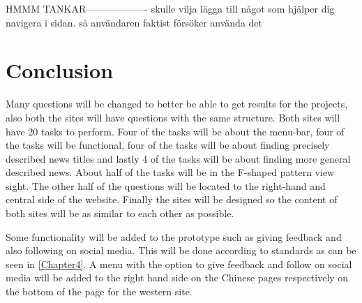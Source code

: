 HMMM TANKAR-------------------
skulle vilja lägga till något som hjälper dig navigera i sidan. så användaren faktist försöker använda det
\section{Conclusion}
Many questions will be changed to better be able to get results for the projects, also both the sites will have questions with the same structure. Both sites will have 20 tasks to perform. Four of the tasks will be about the menu-bar, four of the tasks will be functional, four of the tasks will be about finding precisely described news titles and lastly 4 of the tasks will be about finding more general described news. About half of the tasks will be in the F-shaped pattern view sight. The other half of the questions will be located to the right-hand and central side of the website. Finally the sites will be designed so the content of both sites will be as similar to each other as possible. 

Some functionality will be added to the prototype such as giving feedback and also following on social media. This will be done according to standards as can be seen in \ref{Chapter4}. A menu with the option to give feedback and follow on social media will be added to the right hand side on the Chinese pages respectively on the bottom of the page for the western site.

